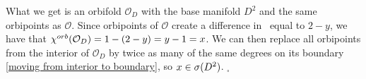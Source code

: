 What we get is an orbifold $\mathcal{O}_D$ with the base 
manifold $D^2$ and the same 
orbipoints as $\mathcal{O}$. Since orbipoints of $\mathcal{O}$ create a difference 
in \Eoc\ equal to $2-y$, we have that ${\chi^{orb}(\mathcal{O}_D)} = 1 - (2-y) = y - 1 = x$. 
We can then replace all orbipoints from the interior of $\mathcal{O}_D$ by twice as many 
of the same degrees on its boundary \ref{moving from interior to boundary}, 
so $x \in {{\sigma}(D^2)}$. $_\square$\\









